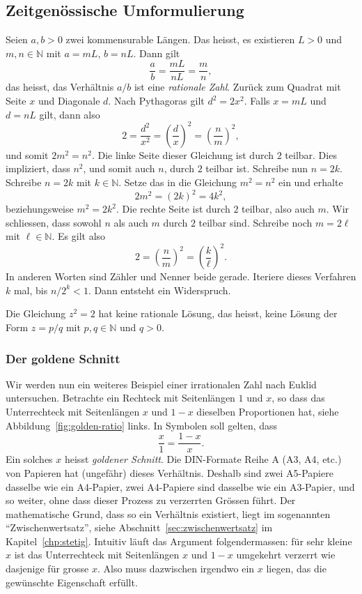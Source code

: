 \documentclass[../main.tex]{subfiles}
\begin{document}
\subsection*{Zeitgenössische Umformulierung}
Seien $a,b > 0$ zwei kommensurable Längen. Das heisst, es existieren $L > 0$
und $m,n \in \mathbb N$ mit $a = mL$, $b= nL$. Dann gilt
\[\frac{a}{b} = \frac{mL}{nL} = \frac{m}{n},\]
das heisst, das Verhältnis $a/b$ ist eine \emph{rationale Zahl}.
Zurück zum Quadrat mit Seite $x$ und Diagonale $d$. Nach Pythagoras
gilt $d^{2} = 2x^{2}$. Falls $x=mL$ und $d=nL$ gilt,
dann also
\[2 = \frac{d^{2}}{x^{2}} = {\left( \frac{d}{x}\right)}^{2} = {\left(\frac{n}{m}\right)}^{2},\]
und somit
\(
2m^{2} = n^{2}\).
Die linke Seite dieser Gleichung ist durch $2$ teilbar. Dies impliziert, dass $n^{2}$, und
somit auch $n$, durch $2$ teilbar ist. Schreibe nun $n = 2k$. Schreibe $n = 2k$ mit
$k \in \mathbb N$. Setze das in die Gleichung $m^2 = n^2$ ein und erhalte
\[
2m^{2} = {(2k)}^{2} = 4k^{2},
\]
beziehungsweise
\(m^{2} = 2k^{2}\).
Die rechte Seite ist durch $2$ teilbar, also auch $m$.
Wir schliessen, dass sowohl $n$ als auch $m$ durch $2$ teilbar sind.
Schreibe noch $m = 2\ell$ mit $\ell \in \mathbb N$. Es gilt also
\[ 2 = {\left(\frac{n}{m}\right)}^{2}
  = {\left(\frac{k}{\ell}\right)}^{2}.\]
In anderen Worten sind Zähler und Nenner beide gerade.
Iteriere dieses Verfahren $k$ mal, bis $n/2^{k} < 1$. Dann entsteht ein Widerspruch.

\begin{corollary*}
  Die Gleichung $z^{2} = 2$ hat keine rationale Lösung, das heisst,
  keine Lösung der Form $z = p/q$ mit $p, q \in \mathbb N$ und $q > 0$.
\end{corollary*}

\subsubsection*{Der goldene Schnitt}
Wir werden nun ein weiteres Beispiel
einer irrationalen Zahl nach Euklid untersuchen.
Betrachte ein Rechteck mit Seitenlängen $1$ und $x$,
so dass das Unterrechteck mit Seitenlängen $x$ und $1-x$ 
dieselben Proportionen hat, siehe Abbildung~\ref{fig:golden-ratio} links. In Symbolen soll gelten, dass
\[
  \frac{x}{1} = \frac{1-x}{x}.
\]
Ein solches $x$ heisst \emph{goldener Schnitt}.
Die DIN-Formate Reihe A (A3, A4, etc.) von Papieren
hat (ungefähr) dieses Verhältnis. Deshalb
sind zwei A5-Papiere dasselbe wie ein A4-Papier,
zwei A4-Papiere sind dasselbe wie ein A3-Papier,
und so weiter, ohne dass dieser Prozess zu verzerrten
Grössen führt.
Der mathematische Grund, dass so ein Verhältnis existiert,
liegt im sogenannten ``Zwischenwertsatz'', siehe
Abschnitt~\ref{sec:zwischenwertsatz} im Kapitel~\ref{chp:stetig}.
Intuitiv läuft das Argument folgendermassen:
für sehr kleine $x$ ist das Unterrechteck mit Seitenlängen
$x$ und $1-x$ umgekehrt verzerrt wie dasjenige für grosse $x$.
Also muss dazwischen irgendwo ein $x$ liegen, das
die gewünschte Eigenschaft erfüllt.
\end{document}
